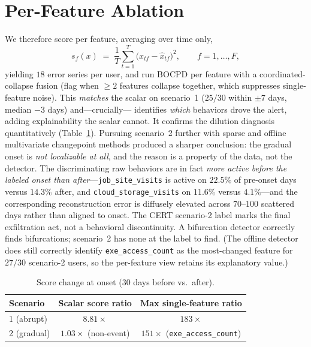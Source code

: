 \documentclass[11pt]{article}
\begin{document}
\section{Per-Feature Ablation}

We therefore score per feature, averaging over time only,
\begin{equation}
  s_f(x) \;=\; \frac{1}{T}\sum_{t=1}^{T}\bigl(x_{tf}-\hat{x}_{tf}\bigr)^2 ,
  \qquad f=1,\dots,F,
\end{equation}
yielding $18$ error series per user, and run BOCPD per feature with a
coordinated-collapse fusion (flag when $\ge 2$ features collapse together,
which suppresses single-feature noise). This \emph{matches} the scalar on
scenario~1 ($25/30$ within $\pm 7$ days, median $-3$ days) and---crucially---
identifies \emph{which} behaviors drove the alert, adding explainability the
scalar cannot. It confirms the dilution diagnosis quantitatively
(Table~\ref{tab:dilution}). Pursuing scenario~2 further with sparse and
offline multivariate changepoint methods produced a sharper conclusion: the
gradual onset is \emph{not localizable at all}, and the reason is a property
of the data, not the detector. The discriminating raw behaviors are in fact
\emph{more active before the labeled onset than after}---\texttt{job\_site\_visits}
is active on $22.5\%$ of pre-onset days versus $14.3\%$ after, and
\texttt{cloud\_storage\_visits} on $11.6\%$ versus $4.1\%$---and the
corresponding reconstruction error is diffusely elevated across $70$--$100$
scattered days rather than aligned to onset. The CERT scenario-2 label marks
the final exfiltration act, not a behavioral discontinuity. A
bifurcation detector correctly finds bifurcations; scenario~2 has none at the
label to find. (The offline detector does still correctly identify
\texttt{exe\_access\_count} as the most-changed feature for $27/30$
scenario-2 users, so the per-feature view retains its explanatory value.)

\begin{table}[t]
  \centering
  \caption{Score change at onset (30 days before vs.\ after).}
  \label{tab:dilution}
  \begin{tabular}{lcc}
    \toprule
    Scenario & Scalar score ratio & Max single-feature ratio \\
    \midrule
    1 (abrupt) & $8.81\times$ & $183\times$ \\
    2 (gradual) & $1.03\times$ (non-event) & $151\times$ (\texttt{exe\_access\_count}) \\
    \bottomrule
  \end{tabular}
\end{table}
\end{document}
